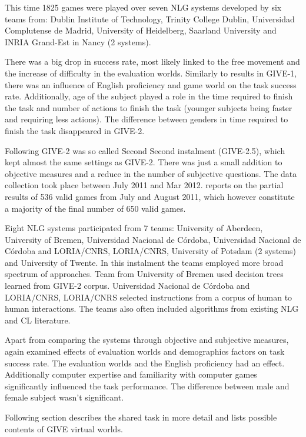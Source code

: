 This time 1825 games were played over seven NLG systems developed by six teams from: Dublin Institute of Technology, Trinity College Dublin, Universidad Complutense de Madrid, University of Heidelberg, Saarland University and INRIA Grand-Est in Nancy (2 systems).

There was a big drop in success rate, most likely linked to the free movement and the increase of difficulty in the evaluation worlds. Similarly to results in GIVE-1, there was an influence of English proficiency and game world on the task success rate. Additionally, age of the subject played a role in the time required to finish the task and number of actions to finish the task (younger subjects being faster and requiring less actions). The difference between genders in time required to finish the task disappeared in GIVE-2.

Following GIVE-2 was so called Second Second instalment (GIVE-2.5), which kept almost the same settings as GIVE-2. There was just a small addition to objective measures and a reduce in the number of subjective questions. The data collection took place between July 2011 and Mar 2012. \citet{striegnitz2011report} reports on the partial results of 536 valid games from July and August 2011, which however constitute a majority of the final number of 650 valid games.

Eight NLG systems participated from 7 teams: University of Aberdeen, University of Bremen, Universidad Nacional de Córdoba, Universidad Nacional de Córdoba and LORIA/CNRS, LORIA/CNRS, University of Potsdam (2 systems) and University of Twente. In this instalment the teams employed more broad spectrum of approaches. Team from University of Bremen used decision trees learned from GIVE-2 corpus. Universidad Nacional de Córdoba and LORIA/CNRS, LORIA/CNRS selected instructions from a corpus of human to human interactions. The teams also often included algorithms from existing NLG and CL literature.

Apart from comparing the systems through objective and subjective measures, \citet{striegnitz2011report} again examined effects of evaluation worlds and demographics factors on task success rate. The evaluation worlds and the English proficiency had an effect. Additionally computer expertise and familiarity with computer games significantly influenced the task performance. The difference between male and female subject wasn't significant.

Following section describes the shared task in more detail and lists possible contents of GIVE virtual worlds.

